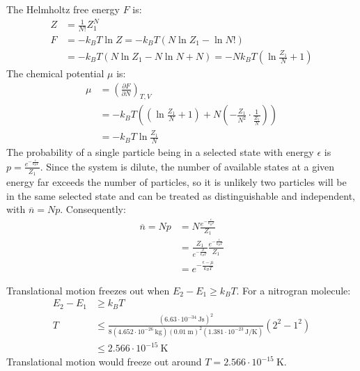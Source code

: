 \documentclass{article}
\begin{document}
The Helmholtz free energy $F$ is:
\begin{equation}
    \begin{split}
        Z & = \frac{1}{N!}Z_1^N \\
        F & = -k_BT\ln Z = -k_BT\left(N\ln Z_1 - \ln N!\right) \\
        & = -k_BT\left(N\ln Z_1 - N\ln N + N\right) = -Nk_BT\left(\ln\frac{Z_1}{N} + 1\right)
    \end{split}
\end{equation}
The chemical potential $\mu$ is:
\begin{equation}
    \begin{split}
        \mu & = {\left(\frac{\partial F}{\partial N}\right)}_{T,V} \\
        & = -k_BT\left(\left(\ln\frac{Z_1}{N} + 1\right) + N\left(-\frac{Z_1}{N^2} \cdot \frac{1}{\frac{Z_1}{N}}\right)\right) \\
        & = -k_BT\ln\frac{Z_1}{N}
    \end{split}
\end{equation}
The probability of a single particle being in a selected state with energy $\epsilon$ is $p = \frac{e^{-\frac{\epsilon}{k_BT}}}{Z_1}$. Since the system is dilute, the number of available states at a given energy far exceeds the number of particles, so it is unlikely two particles will be in the same selected state and can be treated as distinguishable and independent, with $\overline{n} = Np$. Consequently:
\begin{equation}
    \begin{split}
        \overline{n} = Np & = N\frac{e^{-\frac{\epsilon}{k_BT}}}{Z_1} \\
        & = \frac{Z_1}{e^{-\frac{\mu}{k_BT}}}\frac{e^{-\frac{\epsilon}{k_BT}}}{Z_1} \\
        & = e^{-\frac{\epsilon - \mu}{k_BT}}
    \end{split}
\end{equation}

\clearpage

Translational motion freezes out when $E_2 - E_1 \geq k_BT$. For a nitrogran molecule:
\begin{equation}
    \begin{split}
        E_2 - E_1 & \geq k_BT \\
        T & \leq \frac{(6.63 \cdot 10^{-34}~\unit{\joule\second})^2}{8(4.652 \cdot 10^{-26}~\unit{\kilo\gram})(0.01~\unit{\meter})^2(1.381 \cdot 10^{-23}~\unit{\joule\per\kelvin})}(2^2 - 1^2) \\
        & \leq 2.566 \cdot 10^{-15}~\unit{\kelvin}
    \end{split}
\end{equation}
Translational motion would freeze out around $T = 2.566 \cdot 10^{-15}~\unit{\kelvin}$.
\end{document}
